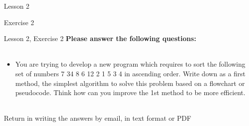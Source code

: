 \documentclass[aspectratio=1610]{beamer}
\begin{document}
\begin{frame}{Lesson 2}{}
\begin{center}
\Huge Exercise 2
\end{center}
\end{frame}

\begin{frame}{Lesson 2, Exercise 2}{}
\Large
\textbf{Please answer the following questions:}\\~\\ 

\Large{
\begin{itemize}
       \item You are trying to develop a new program which requires to sort the following set of numbers 7 34 8 6 12 2 1 5 3 4 in ascending order. Write down as a first method, the simplest algorithm to solve this problem based on a flowchart or pseudocode. Think how can you improve the 1st method to be more efficient.\\~\\
\end{itemize}}

Return in writing the answers by email, in text format or PDF
\end{frame}
\end{document}
